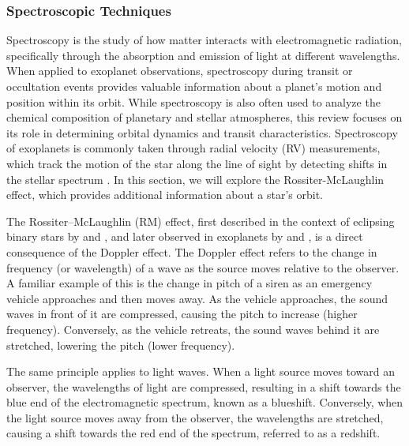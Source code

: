 \documentclass[oneside,12pt]{amsart}
\numberwithin{page}{section}
\begin{document}
\subsubsection{Spectroscopic Techniques}\label{sec:obs-spec}

Spectroscopy is the study of how matter interacts with electromagnetic radiation, specifically through the absorption and emission of light at different wavelengths. When applied to exoplanet observations, spectroscopy during transit or occultation events provides valuable information about a planet’s motion and position within its orbit. While spectroscopy is also often used to analyze the chemical composition of planetary and stellar atmospheres, this review focuses on its role in determining orbital dynamics and transit characteristics. Spectroscopy of exoplanets is commonly taken through radial velocity (RV) measurements, which track the motion of the star along the line of sight by detecting shifts in the stellar spectrum \citep{lovis2010radial}. In this section, we will explore the Rossiter-McLaughlin effect, which provides additional information about a star's orbit.

The Rossiter–McLaughlin (RM) effect, first described in the context of eclipsing binary stars by \citet{rossiter1924detection} and \citet{mclaughlin1924some}, and later observed in exoplanets by \citet{queloz2000detection} and \citet{bundy2000search}, is a direct consequence of the Doppler effect. The Doppler effect refers to the change in frequency (or wavelength) of a wave as the source moves relative to the observer. A familiar example of this is the change in pitch of a siren as an emergency vehicle approaches and then moves away. As the vehicle approaches, the sound waves in front of it are compressed, causing the pitch to increase (higher frequency). Conversely, as the vehicle retreats, the sound waves behind it are stretched, lowering the pitch (lower frequency).

The same principle applies to light waves. When a light source moves toward an observer, the wavelengths of light are compressed, resulting in a shift towards the blue end of the electromagnetic spectrum, known as a blueshift. Conversely, when the light source moves away from the observer, the wavelengths are stretched, causing a shift towards the red end of the spectrum, referred to as a redshift.

\end{document}
